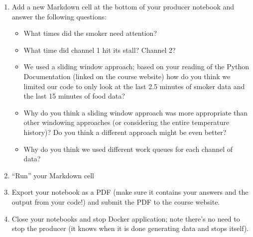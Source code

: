 \documentclass[letterpaper,10pt]{article}
\begin{document}
\begin{enumerate}
	\item Add a new Markdown cell at the bottom of your producer notebook and answer the following questions:
		\begin{itemize}
			\item What times did the smoker need attention?
			\item What time did channel 1 hit its stall? Channel 2?
			\item We used a sliding window approach; based on your reading of the Python Documentation (linked on the course website) how do you think we limited our code to only look at the last 2.5 minutes of smoker data and the last 15 minutes of food data?
			\item Why do you think a sliding window approach was more appropriate than other windowing approaches (or considering the entire temperature history)?  Do you think a different approach might be even better?  
			\item Why do you think we used different work queues for each channel of data?
		\end{itemize}
	\item ``Run'' your Markdown cell
	\item Export your notebook as a PDF (make sure it contains your answers and the output from your code!) and submit the PDF to the course website.
	\item Close your notebooks and stop Docker application; note there's no need to stop the producer (it knows when it is done generating data and stops itself).
\end{enumerate}
\end{document}
